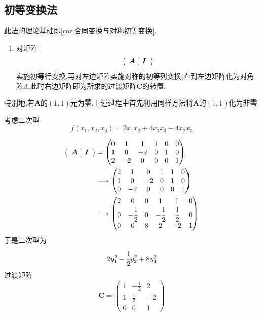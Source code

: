 \subsection{初等变换法}
此法的理论基础即\cref{cor:合同变换与对称初等变换}.
\begin{enumerate}[label={\textup{(\arabic*)}}]
    \item 对矩阵\[\left(\begin{array}{c:c}
        \bm{A}&\bm{I}
    \end{array}\right)\]
    实施初等行变换,再对左边矩阵实施对称的初等列变换,直到左边矩阵化为对角阵$\bm{\varLambda}$,此时右边矩阵即为所求的过渡矩阵$\bm{C}$的转置.
\end{enumerate}
\begin{red}
    \begin{remark}
        特别地,若$\bm{A}$的$\left(1,1\right)$元为零,上述过程中首先利用同样方法将$\bm{A}$的$\left(1,1\right)$化为非零.
    \end{remark}
\end{red}
\begin{brown}
    \begin{example}
        考虑二次型\[
        f\left(
            x_1,x_2,x_3
        \right)=2x_1x_2+4x_1x_3-4x_2x_3
        \]
    \end{example}
    \begin{solution}
        \newpage
        \begin{align*}
            \left(
                \begin{array}{c:c}
                    \bm{A}&\bm{I}
                \end{array}
            \right)&=\begin{pmatrix}
                0&1&1&1&0&0\\
                1&0&-2&0&1&0\\
                2&-2&0&0&0&1
            \end{pmatrix}\\
            &\longrightarrow\begin{pmatrix}
                2&1&0&1&1&0\\
                1&0&-2&0&1&0\\
                0&-2&0&0&0&1
            \end{pmatrix}\\
            &\longrightarrow\begin{pmatrix}
                2&0&0&1&1&0\\
                0&-\cfrac{1}{2}&0&-\cfrac{1}{2}&\cfrac{1}{2}&0\\
                0&0&8&2&-2&1
            \end{pmatrix}
        \end{align*}于是二次型为\[
        2y_1^2-\cfrac{1}{2}y_2^2+8y_3^2
        \]过渡矩阵\[
        \bm{C}=\begin{pmatrix}
            1&-\frac{1}{2}&2\\
            1&\frac{1}{2}&-2\\
            0&0&1
        \end{pmatrix}
        \]
    \end{solution}
\end{brown}
\newpage

